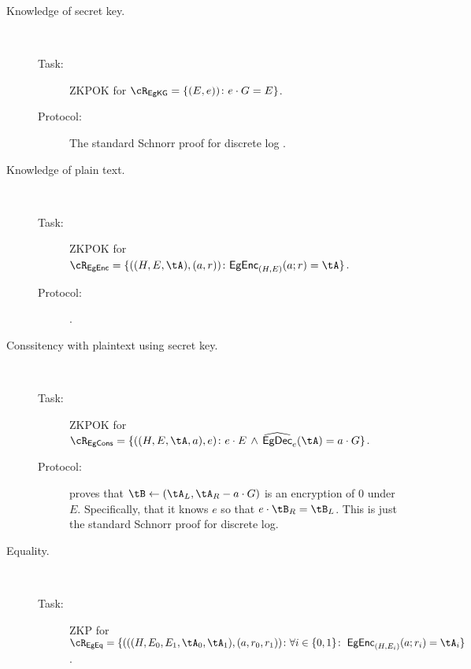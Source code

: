 \begin{description}
	\item[Knowledge of secret key.] ~
	
	
	
	\begin{description}
		\item[Task:] ZKPOK for $\rEgKeyGen = \rEgKeyGenDef$.
		
		\item[Protocol:] The standard Schnorr proof for discrete log \cite{Shoup00b}.
	\end{description}
	
	
	\item[Knowledge of plain text.] ~
	
	\begin{description}
		\item[Task:] ZKPOK for  $\rEgEnc=\rEgEncDef$.
		
		\item[Protocol:]   \cite[Protocol A.2]{HaitnerLNR23}.
		
		
	\end{description}
	
	
		\item[Conssitency  with plaintext using secret key.] ~
	
	\begin{description}
		\item[Task:] ZKPOK for  $\rEgConsSk=\rEgConsSkDef$.
		
		\item[Protocol:]   
		
		\Pc proves that $\tB \asn (\tA_L, \tA_R - a \cdot G)$ is an encryption of $0$ under $E$. Specifically, that it knows $e$ so that  $e\cdot \tB_R  = \tB_L$. This is just the standard Schnorr proof for discrete log.
		
		
	\end{description}
	
	
	
	\item[Equality.] ~

	
	
	\begin{description}
		\item[Task:] ZKP for  $\rEgEq =\rEgEqDef$.
		

\end{description}
\end{description}

